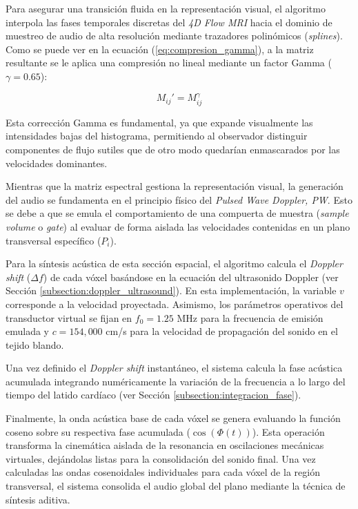 Para asegurar una transición fluida en la representación visual, el algoritmo interpola las fases temporales discretas del \textit{4D Flow MRI} hacia el dominio de muestreo de audio de alta resolución mediante trazadores polinómicos (\textit{splines}). Como se puede ver en la ecuación (\ref{eq:compresion_gamma}), a la matriz resultante se le aplica una compresión no lineal mediante un factor Gamma ($\gamma = 0.65$):

\begin{equation}
    M_{ij}' = M_{ij}^\gamma
    \label{eq:compresion_gamma}
\end{equation}

Esta corrección Gamma es fundamental, ya que expande visualmente las intensidades bajas del histograma, permitiendo al observador distinguir componentes de flujo sutiles que de otro modo quedarían enmascarados por las velocidades dominantes.

Mientras que la matriz espectral gestiona la representación visual, la generación del audio se fundamenta en el principio físico del \textit{Pulsed Wave Doppler, PW}. Esto se debe a que se emula el comportamiento de una compuerta de muestra (\textit{sample volume} o \textit{gate}) al evaluar de forma aislada las velocidades contenidas en un plano transversal específico ($P_i$).

Para la síntesis acústica de esta sección espacial, el algoritmo calcula el \textit{Doppler shift} ($\Delta f$) de cada vóxel basándose en la ecuación del ultrasonido Doppler (ver Sección \ref{subsection:doppler_ultrasound}). En esta implementación, la variable $v$ corresponde a la velocidad proyectada. Asimismo, los parámetros operativos del transductor virtual se fijan en $f_0 = 1.25$ MHz para la frecuencia de emisión emulada y $c = 154,000$ cm/s para la velocidad de propagación del sonido en el tejido blando.

Una vez definido el \textit{Doppler shift} instantáneo, el sistema calcula la fase acústica acumulada integrando numéricamente la variación de la frecuencia a lo largo del tiempo del latido cardíaco (ver Sección \ref{subsection:integracion_fase}).

Finalmente, la onda acústica base de cada vóxel se genera evaluando la función coseno sobre su respectiva fase acumulada ($\cos(\Phi(t))$). Esta operación transforma la cinemática aislada de la resonancia en oscilaciones mecánicas virtuales, dejándolas listas para la consolidación del sonido final. Una vez calculadas las ondas cosenoidales individuales para cada vóxel de la región transversal, el sistema consolida el audio global del plano mediante la técnica de síntesis aditiva.

